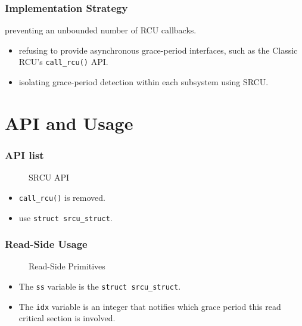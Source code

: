 \documentclass{beamer}
\begin{document}

\begin{frame}[t]
  \frametitle{Implementation Strategy}

  preventing an unbounded number of RCU callbacks.
  \begin{itemize}
  \item refusing to provide asynchronous grace-period interfaces, such as the Classic RCU's \texttt{call\_rcu()} API.
  \item isolating grace-period detection within each subsystem using SRCU.
  \end{itemize}
  
\end{frame}


\section{API and Usage}


\begin{frame}[t]
  \frametitle{API list}

  \begin{figure}
    
    \caption{SRCU API}
  \end{figure}

  \begin{itemize}
  \item \texttt{call\_rcu()} is removed.
  \item use \texttt{struct srcu\_struct}.
  \end{itemize}
  
\end{frame}


\begin{frame}[t]
  \frametitle{Read-Side Usage}

  \begin{figure}
    
    \caption{Read-Side Primitives}
  \end{figure}

  \begin{itemize}
  \item The \texttt{ss} variable is the \texttt{struct srcu\_struct}.
  \item The \texttt{idx} variable is an integer that notifies which grace period this
    read critical section is involved.
  \end{itemize}
  
\end{frame}
\end{document}
